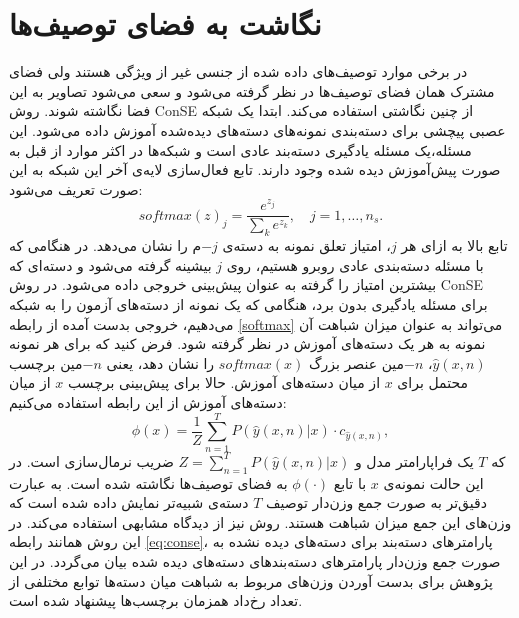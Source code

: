 \section{نگاشت به فضای توصیف‌ها}
در برخی موارد توصیف‌های داده شده از جنسی غیر از ویژگی هستند ولی فضای مشترک همان فضای توصیف‌ها در نظر گرفته می‌شود و سعی می‌شود تصاویر به این فضا نگاشته شوند.
روش ConSE
 \cite{convex} 
از چنین نگاشتی استفاده می‌کند.  ابتدا یک شبکه عصبی پیچشی  برای دسته‌بندی نمونه‌های دسته‌های دیده‌شده آموزش داده می‌شود. این مسئله،یک مسئله یادگیری دسته‌بند عادی است و شبکه‌ها در اکثر موارد از قبل به صورت پیش‌آموزش دیده شده وجود دارند. تابع فعال‌سازی 
  لایه‌ی آخر این شبکه  به این صورت تعریف می‌شود:
 \begin{equation}
 \label{softmax}
 softmax(z)_j = \frac{e^{z_j}}{\sum_k e^{z_k}}, \quad j = 1, \ldots, n_s.
 \end{equation} 
 تابع بالا به ازای هر $j$، امتیاز تعلق نمونه به دسته‌ی $-j$م را نشان می‌دهد. در هنگامی که با مسئله دسته‌بندی عادی روبرو هستیم، روی $j$ بیشینه گرفته می‌شود و دسته‌ای که بیشترین امتیاز را گرفته به عنوان پیش‌بینی خروجی داده می‌شود. در روش ConSE برای مسئله یادگیری بدون برد، هنگامی که یک نمونه از دسته‌های آزمون را به شبکه می‌دهیم، خروجی بدست آمده از رابطه \eqref{softmax} می‌تواند به عنوان میزان شباهت آن نمونه به هر یک دسته‌های آموزش در نظر گرفته شود. 
  فرض کنید که برای هر نمونه
 $\hat{y}(x,n)$،
 $-n$مین 
 عنصر بزرگ $softmax(x)$ را نشان دهد، یعنی $-n$مین برچسب محتمل برای $x$ از میان دسته‌های آموزش. حالا برای پیش‌بینی برچسب $x$ از میان دسته‌های آموزش از این رابطه استفاده می‌کنیم:
 \begin{equation}
 \label{eq:conse}
 \phi(x) = \frac{1}{Z} \sum_{n=1}^T P(\hat{y}(x,n) | x) \cdot c_{\hat{y}(x,n)},
 \end{equation}
 که $T$ یک فراپارامتر مدل و
 $Z = \sum_{n=1}^T P(\hat{y}(x,n) | x) $
 ضریب نرمال‌سازی است. در این حالت نمونه‌ی $x$ با تابع $\phi(\cdot)$ به فضای توصیف‌ها نگاشته شده است. به عبارت دقیق‌تر به صورت جمع وزن‌دار توصیف $T$ دسته‌ی شبیه‌تر نمایش داده شده است که وزن‌های این جمع میزان شباهت هستند. 
 روش 
 \cite{costa}
 نیز از دیدگاه مشابهی استفاده می‌کند. در این روش همانند رابطه \eqref{eq:conse}، پارامترهای دسته‌بند برای دسته‌های دیده نشده به صورت جمع وزن‌دار پارامترهای دسته‌بندهای دسته‌های دیده شده بیان می‌گردد. در این پژوهش برای بدست آوردن وزن‌های مربوط به شباهت میان دسته‌ها توابع مختلفی از تعداد رخ‌داد همزمان برچسب‌ها پیشنهاد شده است.




